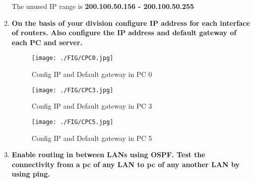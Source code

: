 \documentclass[a4paper,11pt]{article}
\begin{document}
\begin{enumerate}
          The unused IP range is \textbf{ 200.100.50.156 - 200.100.50.255}


    \item \textbf{On the basis of your division configure IP address for each interface of routers. Also configure the IP address and default gateway of each PC and server.}








          \begin{figure}[H]
              \centering
              \texttt{[image: ./FIG/CPC0.jpg]}
              \caption{Config IP and Default gateway in PC 0}
          \end{figure}

          \begin{figure}[H]
              \centering
              \texttt{[image: ./FIG/CPC3.jpg]}
              \caption{Config IP and Default gateway in PC 3}
          \end{figure}


          \begin{figure}[H]
              \centering
              \texttt{[image: ./FIG/CPC5.jpg]}
              \caption{Config IP and Default gateway in PC 5}
          \end{figure}


    \item \textbf{Enable routing in between LANs using OSPF. Test the connectivity from a pc of any LAN
              to pc of any another LAN by using ping.}





\end{enumerate}
\end{document}

